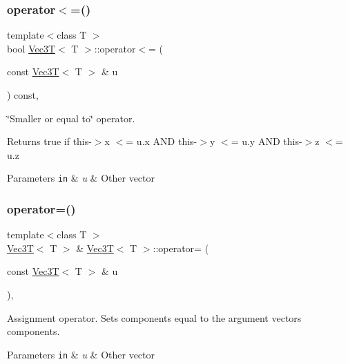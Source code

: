 \subsubsection{\texorpdfstring{operator$<$=()}{operator<=()}}
{\footnotesize\ttfamily template$<$class T $>$ \\
bool \hyperlink{classVec3T}{Vec3T}$<$ T $>$\+::operator$<$= (\begin{DoxyParamCaption}\item[{const \hyperlink{classVec3T}{Vec3T}$<$ T $>$ \&}]{u }\end{DoxyParamCaption}) const\hspace{0.3cm}{\ttfamily [inline]}, {\ttfamily [noexcept]}}



\char`\"{}\+Smaller or equal to\char`\"{} operator. 

Returns true if this-\/$>$x $<$= u.\+x A\+ND this-\/$>$y $<$= u.\+y A\+ND this-\/$>$z $<$= u.\+z 
\begin{DoxyParams}[1]{Parameters}
\mbox{\tt in}  & {\em u} & Other vector \\
\hline
\end{DoxyParams}
\mbox{\label{classVec3T_a34681a81b55b4e7ae818e01b5f27a3e0}} 
\subsubsection{\texorpdfstring{operator=()}{operator=()}}
{\footnotesize\ttfamily template$<$class T $>$ \\
\hyperlink{classVec3T}{Vec3T}$<$ T $>$ \& \hyperlink{classVec3T}{Vec3T}$<$ T $>$\+::operator= (\begin{DoxyParamCaption}\item[{const \hyperlink{classVec3T}{Vec3T}$<$ T $>$ \&}]{u }\end{DoxyParamCaption})\hspace{0.3cm}{\ttfamily [inline]}, {\ttfamily [noexcept]}}



Assignment operator. Sets components equal to the argument vector\textquotesingle{}s components. 


\begin{DoxyParams}[1]{Parameters}
\mbox{\tt in}  & {\em u} & Other vector \\
\hline
\end{DoxyParams}
\mbox{\label{classVec3T_a715546682c26647643148a80087c4ab4}} 
